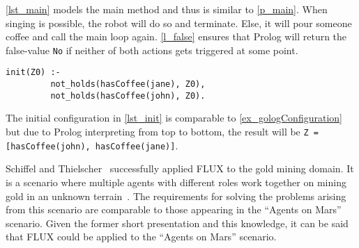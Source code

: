 \autoref{lst_main} models the main method and thus is similar to \autoref{p_main}.
When singing is possible, the robot will do so and terminate.
Else, it will pour someone coffee and call the main loop again.
\autoref{l_false} ensures that Prolog will return the false-value \texttt{No} if neither of both actions gets triggered at some point.
\begin{lstlisting}[firstnumber=17, caption={Initial configuration.}, label=lst_init]
  init(Z0) :-
         not_holds(hasCoffee(jane), Z0),
         not_holds(hasCoffee(john), Z0).
\end{lstlisting}
The initial configuration in \autoref{lst_init} is comparable to \autoref{ex_gologConfiguration} but due to Prolog interpreting from top to bottom, the result will be \texttt{Z = [hasCoffee(john), hasCoffee(jane)]}.

Schiffel and Thielscher~\cite{schiffel_multi-agent_2007} successfully applied FLUX to the gold mining domain.
It is a scenario where multiple agents with different roles work together on mining gold in an unknown terrain~\cite{schiffel_multi-agent_2007}.
The requirements for solving the problems arising from this scenario are comparable to those appearing in the \enquote{Agents on Mars} scenario.
Given the former short presentation and this knowledge, it can be said that FLUX could be applied to the \enquote{Agents on Mars} scenario.
